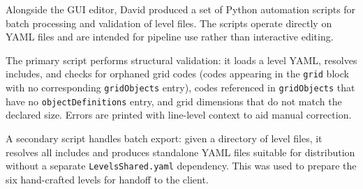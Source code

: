 Alongside the GUI editor, David produced a set of Python automation
scripts for batch processing and validation of level files. The scripts
operate directly on YAML files and are intended for pipeline use rather
than interactive editing.

The primary script performs structural validation: it loads a level
YAML, resolves includes, and checks for orphaned grid codes (codes
appearing in the \texttt{grid} block with no corresponding
\texttt{gridObjects} entry), codes referenced in \texttt{gridObjects}
that have no \texttt{objectDefinitions} entry, and grid dimensions that
do not match the declared size. Errors are printed with line-level
context to aid manual correction.

A secondary script handles batch export: given a directory of level
files, it resolves all includes and produces standalone YAML files
suitable for distribution without a separate \texttt{LevelsShared.yaml}
dependency. This was used to prepare the six hand-crafted levels for
handoff to the client.

\begin{Shaded}
\begin{Highlighting}[]
\OperatorTok{=}
\OperatorTok{=}\NormalTok{, }\StringTok{\textquotesingle{}\textquotesingle{}}\NormalTok{))}
\OperatorTok{=}\NormalTok{, \{\})}
\OperatorTok{=}\NormalTok{, \{\})}

\OperatorTok{=} \OperatorTok{!=} \StringTok{\textquotesingle{}\_\_\textquotesingle{}}\NormalTok{)}
         
\SpecialCharTok{\{}\SpecialCharTok{\}}\NormalTok{)}

\end{Highlighting}
\end{Shaded}

